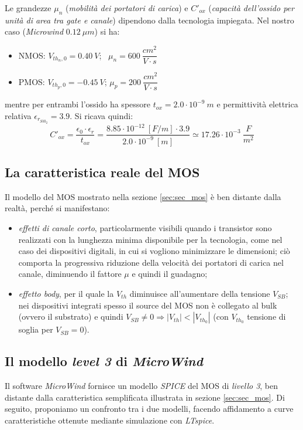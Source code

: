 Le grandezze $\mu _n$ (\textit{mobilità dei portatori di carica}) e $C'_{ox}$ (\textit{capacità dell’ossido per unità di area tra gate e canale}) dipendono dalla tecnologia impiegata. Nel nostro caso (\textit{Microwind} $0.12 \ \mu m$) si ha:
\begin{itemize}
	\item NMOS: \quad $V_{th_n,0} = 0.40 \ V$; \ \quad $\mu _n = 600 \ \dfrac{cm^2}{V \cdot s}$
	\item PMOS: \quad $V_{th_p,0} = -0.45 \ V$; \quad $\mu _p = 200 \ \dfrac{cm^2}{V \cdot s}$
\end{itemize}
mentre per entrambi l'ossido ha spessore $t_{ox} = 2.0 \cdot 10^{-9} \ m$ e permittività elettrica relativa $\epsilon_{r_{Si0_2}} = 3.9$. Si ricava quindi:
\begin{equation}
C'_{ox} = \frac{\epsilon_0 \cdot \epsilon_r}{t_{ox}} = \dfrac{8.85 \cdot 10^{-12} \ [F/m] \cdot 3.9}{2.0 \cdot 10^{-9} \ [m]}\simeq 17.26 \cdot 10^{-3} \ \dfrac{F}{m^2}
\end{equation}

\subsection{La caratteristica reale del MOS}
\label{sec:sec_caratteristicaMOS}
Il modello del MOS mostrato nella sezione \ref{sec:sec_mos} è ben distante dalla realtà, perché si manifestano:
\begin{itemize}
	\item \textit{effetti di canale corto}, particolarmente visibili quando i transistor sono realizzati con la lunghezza minima disponibile per la tecnologia, come nel caso dei dispositivi digitali, in cui si vogliono minimizzare le dimensioni; ciò comporta la progressiva riduzione della velocità dei portatori di carica nel canale, diminuendo il fattore $\mu$ e quindi il guadagno;
	\item \textit{effetto body}, per il quale la $V_{th}$ diminuisce all'aumentare della tensione $V_{SB}$; nei dispositivi integrati spesso il source del MOS non è collegato al bulk (ovvero il substrato) e quindi $V_{SB} \neq 0 \Rightarrow \left | V_{th} \right | < \left | V_{th_0} \right | $ (con $V_{th_0}$ tensione di soglia per $V_{SB}=0$).
\end{itemize}

\subsection{Il modello \textit{level 3} di \textit{MicroWind}}
\label{sec:ilModelloDiMicrowind}
Il software \textit{MicroWind} fornisce un modello \textit{SPICE} del MOS di \textit{livello 3}, ben distante dalla caratteristica semplificata illustrata in sezione \ref{sec:sec_mos}. Di seguito, proponiamo un confronto tra i due modelli, facendo affidamento a curve caratteristiche ottenute mediante simulazione con \textit{LTspice}.


